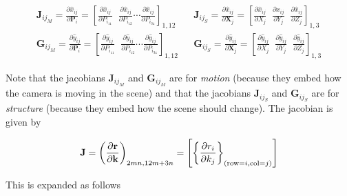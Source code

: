 \begin{align}
    \mathbf{J}_{ij_M} = \frac{\partial \hat{x}_{ij}}{\partial \mathbf{P}_i} = \left [ 
        \frac{\partial \hat{x}_{ij}}{\partial P_{i_{11}}} \;\;
        \frac{\partial \hat{x}_{ij}}{\partial P_{i_{12}}} \cdots
        \frac{\partial \hat{x}_{ij}}{\partial P_{i_{34}}}
        \right ]_{1, 12}
    &&
    \mathbf{J}_{ij_S} = \frac{\partial \hat{x}_{ij}}{\partial \mathbf{X}_j} = \left [ 
        \frac{\partial \hat{x}_{ij}}{\partial X_{j}} \;\;
        \frac{\partial \hat{x}_{ij}}{\partial Y_{j}} \;\;
        \frac{\partial \hat{x}_{ij}}{\partial Z_{j}}
        \right ]_{1, 3}
    \nonumber \\
    \mathbf{G}_{ij_M} = \frac{\partial \hat{y}_{ij}}{\partial \mathbf{P}_i} = \left [ 
        \frac{\partial \hat{y}_{ij}}{\partial P_{i_{11}}} \;\;
        \frac{\partial \hat{y}_{ij}}{\partial P_{i_{12}}} \cdots
        \frac{\partial \hat{y}_{ij}}{\partial P_{i_{34}}}
        \right ]_{1, 12}
    &&
    \mathbf{G}_{ij_S} = \frac{\partial \hat{y}_{ij}}{\partial \mathbf{X}_j} = \left [ 
        \frac{\partial \hat{y}_{ij}}{\partial X_{j}} \;\;
        \frac{\partial \hat{y}_{ij}}{\partial Y_{j}} \;\;
        \frac{\partial \hat{y}_{ij}}{\partial Z_{j}}
        \right ]_{1, 3}
    \label{q4b-ba-jac-sh-defs}
\end{align}

Note that the jacobians $\mathbf{J}_{ij_M}$ and $\mathbf{G}_{ij_M}$ are for \emph{motion} (because they embed how the camera is moving in the scene) and that the jacobians $\mathbf{J}_{ij_S}$ and $\mathbf{G}_{ij_S}$ are for \emph{structure} (because they embed how the scene should change). The jacobian is given by

\begin{equation}
    \mathbf{J} = \left ( \frac{\partial \mathbf{r}}{\partial \mathbf{k}} \right )_{2mn, 12m+3n} = \left [ \left \{ \frac{\partial r_i}{\partial k_j} \right \}_{(\textup{row} = i, \textup{col} = j)} \right ]
\end{equation}

This is expanded as follows

